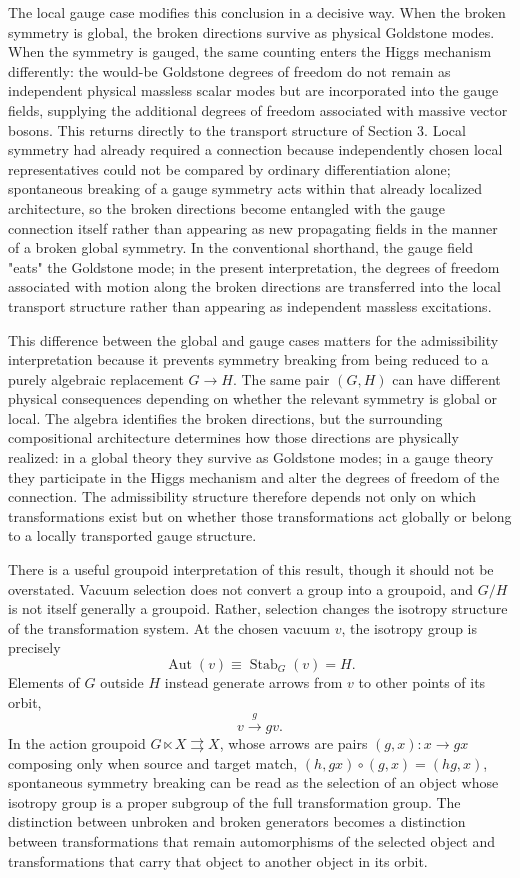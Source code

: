 \documentclass[11pt]{article}
\begin{document}
The local gauge case modifies this conclusion in a decisive way. When the broken symmetry is global, the broken directions survive as physical Goldstone modes. When the symmetry is gauged, the same counting enters the Higgs mechanism \cite{Higgs1964a,Higgs1964b,EnglertBrout1964,GuralnikHagenKibble1964,Kibble1967} differently: the would-be Goldstone degrees of freedom do not remain as independent physical massless scalar modes but are incorporated into the gauge fields, supplying the additional degrees of freedom associated with massive vector bosons. This returns directly to the transport structure of Section 3. Local symmetry had already required a connection because independently chosen local representatives could not be compared by ordinary differentiation alone; spontaneous breaking of a gauge symmetry acts within that already localized architecture, so the broken directions become entangled with the gauge connection itself rather than appearing as new propagating fields in the manner of a broken global symmetry. In the conventional shorthand, the gauge field "eats" the Goldstone mode; in the present interpretation, the degrees of freedom associated with motion along the broken directions are transferred into the local transport structure rather than appearing as independent massless excitations.

This difference between the global and gauge cases matters for the admissibility interpretation because it prevents symmetry breaking from being reduced to a purely algebraic replacement $G \rightarrow H$. The same pair $(G,H)$ can have different physical consequences depending on whether the relevant symmetry is global or local. The algebra identifies the broken directions, but the surrounding compositional architecture determines how those directions are physically realized: in a global theory they survive as Goldstone modes; in a gauge theory they participate in the Higgs mechanism and alter the degrees of freedom of the connection. The admissibility structure therefore depends not only on which transformations exist but on whether those transformations act globally or belong to a locally transported gauge structure.

There is a useful groupoid interpretation of this result, though it should not be overstated. Vacuum selection does not convert a group into a groupoid, and $G/H$ is not itself generally a groupoid. Rather, selection changes the isotropy structure of the transformation system. At the chosen vacuum $v$, the isotropy group is precisely
\[
\operatorname{Aut}(v) \equiv \operatorname{Stab}_G(v) = H.
\]
Elements of $G$ outside $H$ instead generate arrows from $v$ to other points of its orbit,
\[
v \xrightarrow{g} gv.
\]
In the action groupoid $G \ltimes X \rightrightarrows X$, whose arrows are pairs $(g,x) : x \rightarrow gx$ composing only when source and target match, $(h, gx) \circ (g,x) = (hg, x)$, spontaneous symmetry breaking can be read as the selection of an object whose isotropy group is a proper subgroup of the full transformation group. The distinction between unbroken and broken generators becomes a distinction between transformations that remain automorphisms of the selected object and transformations that carry that object to another object in its orbit.
\end{document}
